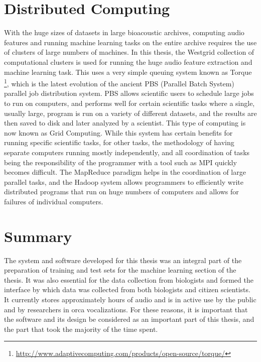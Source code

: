 \documentclass[12pt,oneside]{book}
\begin{document}
\section{Distributed Computing}
With the huge sizes of datasets in large bioacoustic archives,
computing audio features and running machine learning tasks on the
entire archive requires the use of clusters of large numbers of
machines.  In this thesis, the Westgrid collection of computational
clusters is used for running the huge audio feature extraction and
machine learning task. This uses a very simple queuing system known as
Torque \footnote{\url{http://www.adaptivecomputing.com/products/open-source/torque/}},
which is the latest evolution of the ancient PBS
\cite{henderson1995job} (Parallel Batch System) parallel job
distribution system. PBS allows scientific users to schedule large
jobs to run on computers, and performs well for certain scientific
tasks where a single, usually large, program is run on a variety of
different datasets, and the results are then saved to disk and later
analyzed by a scientist. This type of computing is now known as Grid
Computing.  While this system has certain benefits for running
specific scientific tasks, for other tasks, the methodology of having
separate computers running mostly independently, and all coordination
of tasks being the responsibility of the programmer with a tool such
as MPI quickly becomes difficult. The MapReduce paradigm helps in the
coordination of large parallel tasks, and the Hadoop system allows
programmers to efficiently write distributed programs that run on huge
numbers of computers and allows for failures of individual computers.

\section{Summary}

The system and software developed for this thesis was an integral part
of the preparation of training and test sets for the machine learning
section of the thesis.  It was also essential for the data collection
from biologists and formed the interface by which data was collected
from both biologists and citizen scientists.  It currently stores
approximately \aboutHoursOfOrchiveRecordings hours of audio and is in
active use by the public and by researchers in orca vocalizations.
For these reasons, it is important that the software and its design be
considered as an important part of this thesis, and the part that took
the majority of the time spent.
\end{document}
